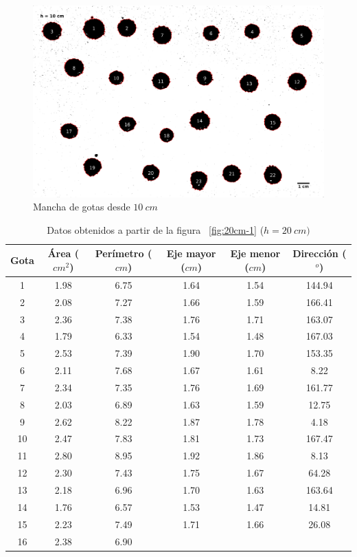 \begin{figure}[H] \centering
\includegraphics[width=0.66\linewidth]{src/10-1.png} \caption{Mancha de gotas
desde $10\ cm$} \label{fig:10cm-1} \end{figure}

\begin{table}[H] \centering \caption{Datos obtenidos a partir de la figura
    ~\ref{fig:20cm-1} ($h = 20\ cm)$} \label{tab:20cm} \begin{tabular}{cccccc}
        \toprule Gota & Área ($cm^2$) & Perímetro ($cm$) & Eje mayor ($cm$) &
        Eje menor ($cm$) & Dirección ($^o$) \\ \midrule 1     & 1.98 & 6.75  &
        1.64 & 1.54 & 144.94 \\ 2     & 2.08 & 7.27  & 1.66 & 1.59 & 166.41 \\
        3     & 2.36 & 7.38  & 1.76 & 1.71 & 163.07 \\ 4     & 1.79 & 6.33  &
        1.54 & 1.48 & 167.03 \\ 5     & 2.53 & 7.39  & 1.90 & 1.70 & 153.35 \\
        6     & 2.11 & 7.68  & 1.67 & 1.61 & 8.22   \\ 7     & 2.34 & 7.35  &
        1.76 & 1.69 & 161.77 \\ 8     & 2.03 & 6.89  & 1.63 & 1.59 & 12.75  \\
        9     & 2.62 & 8.22  & 1.87 & 1.78 & 4.18   \\ 10    & 2.47 & 7.83  &
        1.81 & 1.73 & 167.47 \\ 11    & 2.80 & 8.95  & 1.92 & 1.86 & 8.13   \\
        12    & 2.30 & 7.43  & 1.75 & 1.67 & 64.28  \\ 13    & 2.18 & 6.96  &
        1.70 & 1.63 & 163.64 \\ 14    & 1.76 & 6.57  & 1.53 & 1.47 & 14.81  \\
        15    & 2.23 & 7.49  & 1.71 & 1.66 & 26.08  \\ 16    & 2.38 & 6.90  &

\end{tabular}
\end{table}

